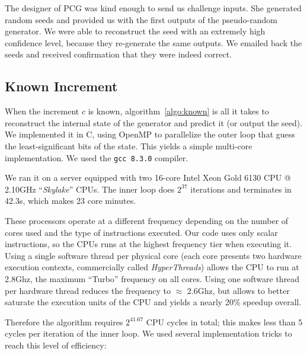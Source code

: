 \documentclass[submission,svgnames,journal=tosc]{iacrtrans}
\begin{document}
The designer of \textsf{PCG} was kind enough to send us challenge inputs. She
generated random seeds and provided us with the first outputs of the
pseudo-random generator. We were able to reconstruct the seed with an extremely
high confidence level, because they re-generate the same outputs. We emailed
back the seeds and received confirmation that they were indeed correct.

\subsection{Known Increment}

When the increment $c$ is known, algorithm~\ref{algo:known} is all it takes to
reconstruct the internal state of the generator and predict it (or output the
seed). We implemented it in \textsf{C}, using \textsf{OpenMP} to parallelize the
outer loop that guess the least-significant bits of the state. This yields a
simple multi-core implementation. We used the \texttt{gcc 8.3.0} compiler.

We ran it on a server equipped with two 16-core \textsf{Intel Xeon Gold 6130 CPU
  @ 2.10GHz} ``\emph{Skylake}'' CPUs. The inner loop does $2^{37}$ iterations
and terminates in 42.3s, which makes 23 core minutes.

These processors operate at a different frequency depending on the number of
cores used and the type of instructions executed. Our code uses only scalar
instructions, so the CPUs runs at the highest frequency tier when executing
it. Using a single software thread per physical core (each core presents two
hardware execution contexts, commercially called \emph{HyperThreads}) allows the
CPU to run at 2.8Ghz, the maximum ``Turbo'' frequency on all cores. Using one
software thread per hardware thread reduces the frequency to $\approx$ 2.6Ghz,
but allows to better saturate the execution units of the CPU and yields a nearly
20\% speedup overall.

Therefore the algorithm requires $2^{41.67}$ CPU cycles in total; this makes
less than 5 cycles per iteration of the inner loop. We used several
implementation tricks to reach this level of efficiency:
\end{document}
